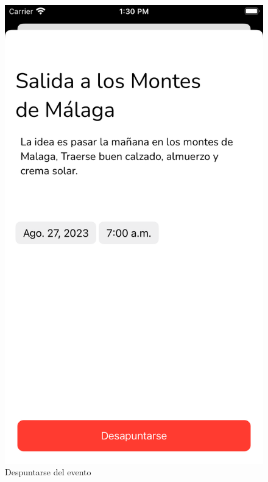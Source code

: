\begin{appendices}
\begin{figure}[H]
\begin{minipage}{0.3\textwidth}
            \includegraphics[cframe=black 2pt,width=1\linewidth]{images/manual/desapuntarse.png}
        \end{minipage}
        \caption{Despuntarse del evento}
        \label{fig:my_label}
\end{figure}
\end{appendices}